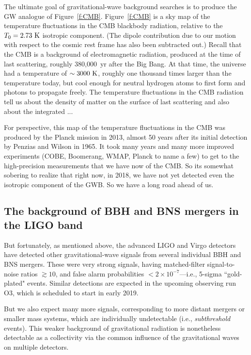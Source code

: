 \documentclass[11pt]{article}
\numberwithin{equation}{section}
\begin{document}
{The ultimate goal of gravitational-wave background
searches is to produce the GW analogue of Figure~\ref{f:CMB}.
Figure~\ref{f:CMB} is a sky map of the temperature 
fluctuations in the CMB blackbody radiation, relative 
to the $T_0 = 2.73~{\rm K}$ isotropic component.
(The dipole contribution due to our motion with respect 
to the cosmic rest frame has also been subtracted out.)
Recall that the CMB is a background of electromagnetic
radiation, produced at the time of last scattering,
roughly 380,000~yr after the Big Bang.
At that time, the universe had a temperature of 
$\sim 3000~{\rm K}$, roughly one thousand times larger 
than the temperature today, but cool enough for 
neutral hydrogen atoms to first form and photons to 
propagate freely.
The temperature fluctuations in the CMB radiation tell
us about the density of matter on the surface of last 
scattering and also about the integrated ...

For perspective, this map of the temperature fluctuations 
in the CMB was produced by the Planck mission in 2013,
almost 50 years after its initial detection by Penzias
and Wilson in 1965.
It took many years and many more improved experiments
(COBE, Boomerang, WMAP, Planck to name a few) to get to 
the high-precision measurements that we have now of the 
CMB.
So its somewhat sobering to realize that right now, 
in 2018, we have not yet detected even the isotropic 
component of the GWB.
So we have a long road ahead of us.  

\subsection{The background of BBH and BNS mergers in the 
LIGO band}

But fortunately, as mentioned above, the advanced LIGO
and Virgo detectors have detected other 
gravitational-wave signals from several individual BBH 
and BNS mergers.
These were very strong signals, having 
matched-filter signal-to-noise ratios $\gtrsim 10$, 
and false alarm probabilities $<2\times 10^{-7}$---i.e.,
5-sigma ``gold-plated" events.
Similar detections are expected in the upcoming 
observing run O3, which is scheduled to start in early 2019.

But we also expect many more signals, corresponding to
more distant mergers or smaller mass systems, which are 
individually undetectable (i.e., {\em subthreshold} events).
This weaker background of gravitational radiation is 
nonetheless detectable as a collectivity via the common 
influence of the gravitational waves on multiple detectors.

}
\end{document}
